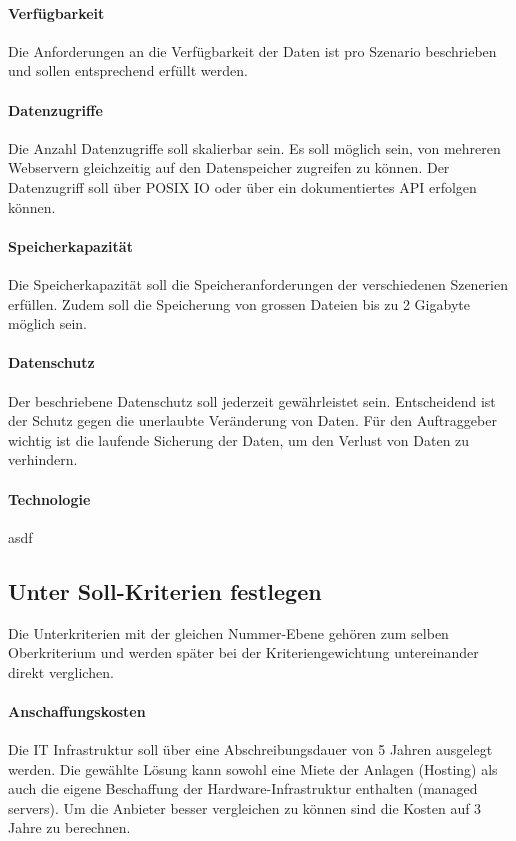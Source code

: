 \paragraph{Verfügbarkeit}\label{Soll-2}
Die Anforderungen an die Verfügbarkeit der Daten ist pro Szenario beschrieben und sollen entsprechend erfüllt werden. 

\paragraph{Datenzugriffe}\label{Soll-3}
Die Anzahl Datenzugriffe soll skalierbar sein. Es soll möglich sein, von mehreren Webservern gleichzeitig auf den Datenspeicher zugreifen zu können. Der Datenzugriff soll über POSIX IO oder über ein dokumentiertes API erfolgen können.

\paragraph{Speicherkapazität}\label{Soll-4}
Die Speicherkapazität soll die Speicheranforderungen der verschiedenen Szenerien erfüllen. Zudem soll die Speicherung von grossen Dateien bis zu 2 Gigabyte möglich sein.

\paragraph{Datenschutz}\label{Soll-5}
Der beschriebene Datenschutz soll jederzeit gewährleistet sein. Entscheidend ist der Schutz gegen die unerlaubte Veränderung von Daten. Für den Auftraggeber wichtig ist die laufende Sicherung der Daten, um den Verlust von Daten zu verhindern.

\paragraph{Technologie}\label{Soll-6}
asdf

\subsection{Unter Soll-Kriterien festlegen}
Die Unterkriterien mit der gleichen Nummer-Ebene gehören zum selben Oberkriterium und werden später bei der Kriteriengewichtung untereinander direkt verglichen.

\setcounter{paragraph}{0}
\renewcommand\theparagraph{Soll-1-\arabic{paragraph}}

\paragraph{Anschaffungskosten}\label{Soll-1-1}
Die IT Infrastruktur soll über eine Abschreibungsdauer von 5 Jahren ausgelegt werden. Die gewählte Lösung kann sowohl eine Miete der Anlagen (Hosting) als auch die eigene Beschaffung der Hardware-Infrastruktur enthalten (managed servers). Um die Anbieter besser vergleichen zu können sind die Kosten auf 3 Jahre zu berechnen. 

